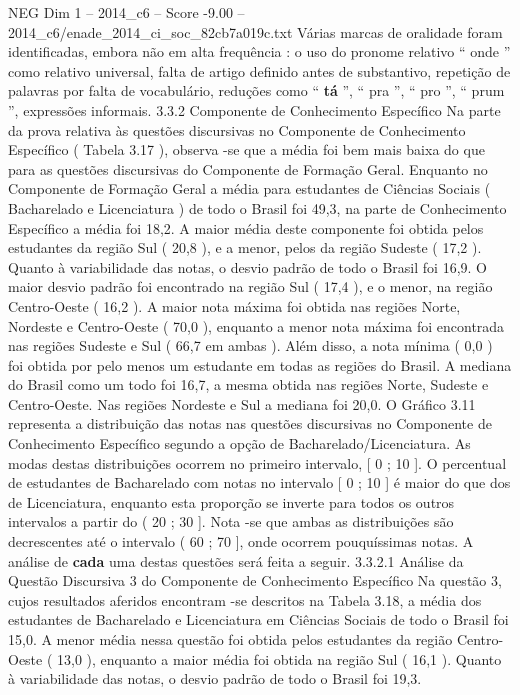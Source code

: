 \begin{textsample}{NEG Dim 1 – 2014\_c6 – Score -9.00 – 2014\_c6/enade\_2014\_ci\_soc\_82cb7a019c.txt}
Várias marcas de oralidade foram identificadas, embora não em alta frequência : o uso do pronome relativo “ onde ” como relativo universal, falta de artigo definido antes de substantivo, repetição de palavras por falta de vocabulário, reduções como “ \textbf{tá} ”, “ pra ”, “ pro ”, “ prum ”, expressões informais. 3.3.2 Componente de Conhecimento Específico Na parte da prova relativa às questões discursivas no Componente de Conhecimento Específico ( Tabela 3.17 ), observa -se que a média foi bem mais baixa do que para as questões discursivas do Componente de Formação Geral.
Enquanto no Componente de Formação Geral a média para estudantes de Ciências Sociais ( Bacharelado e Licenciatura ) de todo o Brasil foi 49,3, na parte de Conhecimento Específico a média foi 18,2.
A maior média deste componente foi obtida pelos estudantes da região Sul ( 20,8 ), e a menor, pelos da região Sudeste ( 17,2 ).
Quanto à variabilidade das notas, o desvio padrão de todo o Brasil foi 16,9.
O maior desvio padrão foi encontrado na região Sul ( 17,4 ), e o menor, na região Centro-Oeste ( 16,2 ).
A maior nota máxima foi obtida nas regiões Norte, Nordeste e Centro-Oeste ( 70,0 ), enquanto a menor nota máxima foi encontrada nas regiões Sudeste e Sul ( 66,7 em ambas ).
Além disso, a nota mínima ( 0,0 ) foi obtida por pelo menos um estudante em todas as regiões do Brasil.
A mediana do Brasil como um todo foi 16,7, a mesma obtida nas regiões Norte, Sudeste e Centro-Oeste.
Nas regiões Nordeste e Sul a mediana foi 20,0.
O Gráfico 3.11 representa a distribuição das notas nas questões discursivas no Componente de Conhecimento Específico segundo a opção de Bacharelado/Licenciatura.
As modas destas distribuições ocorrem no primeiro intervalo, [ 0 ; 10 ].
O percentual de estudantes de Bacharelado com notas no intervalo [ 0 ; 10 ] é maior do que dos de Licenciatura, enquanto esta proporção se inverte para todos os outros intervalos a partir do ( 20 ; 30 ].
Nota -se que ambas as distribuições são decrescentes até o intervalo ( 60 ; 70 ], onde ocorrem pouquíssimas notas.
A análise de \textbf{cada} uma destas questões será feita a seguir. 3.3.2.1 Análise da Questão Discursiva 3 do Componente de Conhecimento Específico Na questão 3, cujos resultados aferidos encontram -se descritos na Tabela 3.18, a média dos estudantes de Bacharelado e Licenciatura em Ciências Sociais de todo o Brasil foi 15,0.
A menor média nessa questão foi obtida pelos estudantes da região Centro-Oeste ( 13,0 ), enquanto a maior média foi obtida na região Sul ( 16,1 ).
Quanto à variabilidade das notas, o desvio padrão de todo o Brasil foi 19,3.

\end{textsample}
